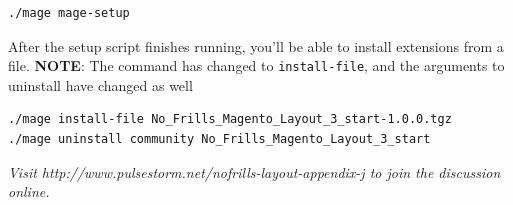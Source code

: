 \documentclass[oneside]{book}
\begin{document}
\begin{lstlisting}
./mage mage-setup

\end{lstlisting}


After the setup script finishes running, you'll be able to install extensions from a file. \textbf{NOTE}: The command has changed to \footnotesize\texttt{install-file}\normalsize, and the arguments to uninstall have changed as well

\begin{lstlisting}
./mage install-file No_Frills_Magento_Layout_3_start-1.0.0.tgz
./mage uninstall community No_Frills_Magento_Layout_3_start

\end{lstlisting}


\emph{Visit http://www.pulsestorm.net/nofrills-layout-appendix-j to join the discussion online.}
\end{document}
